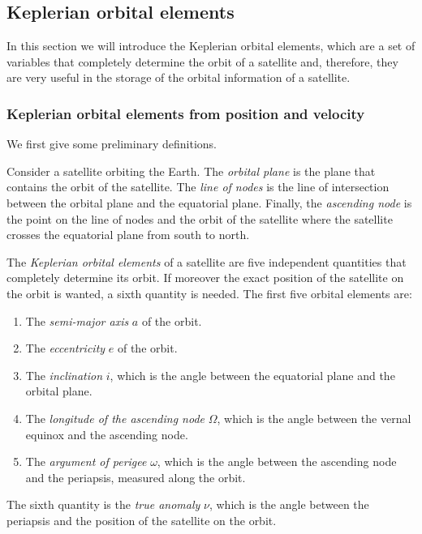 \documentclass[../main.tex]{subfiles}
\begin{document}
\subsection{Keplerian orbital elements}
In this section we will introduce the Keplerian orbital elements, which are a set of variables that completely determine the orbit of a satellite and, therefore, they are very useful in the storage of the orbital information of a satellite.
\subsubsection{Keplerian orbital elements from position and velocity}
We first give some preliminary definitions.
\begin{definition}
  Consider a satellite orbiting the Earth. The \emph{orbital plane} is the plane that contains the orbit of the satellite. The \emph{line of nodes} is the line of intersection between the orbital plane and the equatorial plane. Finally, the \emph{ascending node}  is the point on the line of nodes and the orbit of the satellite where the satellite crosses the equatorial plane from south to north.
\end{definition}
\begin{definition}
  The \emph{Keplerian orbital elements} of a satellite are five independent quantities that completely determine its orbit. If moreover the exact position of the satellite on the orbit is wanted, a sixth quantity is needed. The first five orbital elements are:
  \begin{enumerate}
    \item The \emph{semi-major axis} $a$ of the orbit.
    \item The \emph{eccentricity} $e$ of the orbit.
    \item The \emph{inclination} $i$, which is the angle between the equatorial plane and the orbital plane.
    \item The \emph{longitude of the ascending node} $\Omega$, which is the angle between the vernal equinox and the ascending node.
    \item The \emph{argument of perigee} $\omega$, which is the angle between the ascending node and the periapsis, measured along the orbit.
  \end{enumerate}
  The sixth quantity is the \emph{true anomaly} $\nu$, which is the angle between the periapsis and the position of the satellite on the orbit.
\end{definition}
\end{document}
